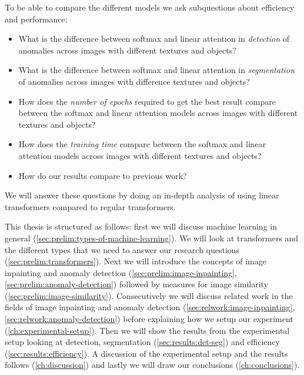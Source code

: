 To be able to compare the different models we ask subquestions about efficiency and performance:
\begin{itemize}
    \item What is the difference between softmax and linear attention in \textsl{detection} of anomalies across images with different textures and objects?
    \item What is the difference between softmax and linear attention in \textsl{segmentation} of anomalies across images with difference textures and objects?
    \item How does the \textsl{number of epochs} required to get the best result compare between the softmax and linear attention models across images with different textures and objects?
    \item How does the \textsl{training time} compare between the softmax and linear attention models across images with different textures and objects?
    \item How do our results compare to previous work?
\end{itemize}

We will answer these questions by doing an in-depth analysis of using linear transformers compared to regular transformers.

This thesis is structured as follows: first we will discuss machine learning in general (\ref{sec:prelim:types-of-machine-learning}). We will look at transformers and the different types that we need to answer our research questions (\ref{sec:prelim:transformers}). Next we will introduce the concepts of image inpainting and anomaly detection (\ref{sec:prelim:image-inpainting}, \ref{sec:prelim:anomaly-detection}) followed by measures for image similarity (\ref{sec:prelim:image-similarity}). Consecutively we will discuss related work in the fields of image inpainting and anomaly detection (\ref{sec:relwork:image-inpainting}, \ref{sec:relwork:anomaly-detection}) before explaining how we setup our experiment (\ref{ch:experimental-setup}). Then we will show the results from the experimental setup looking at detection, segmentation (\ref{sec:results:det-seg}) and efficiency (\ref{sec:results:efficiency}). A discussion of the experimental setup and the results follows (\ref{ch:discussion}) and lastly we will draw our conclusions (\ref{ch:conclusions}).